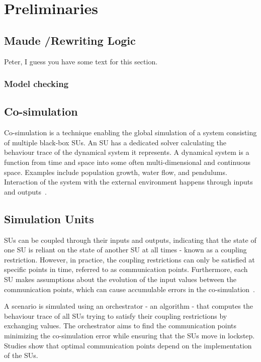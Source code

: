 \section{Preliminaries}\label{sc:background}
\subsection{Maude /Rewriting Logic}
Peter, I guess you have some text for this section. 

\subsubsection{Model checking}


\subsection{Co-simulation}
Co-simulation is a technique enabling the global simulation of a system consisting of multiple black-box SUs. 
An SU has a dedicated solver calculating the behaviour trace of the dynamical system it represents. 
A dynamical system is a function from time and space into some often multi-dimensional and continuous space. Examples include population growth, water flow, and pendulums. 
Interaction of the system with the external environment happens through inputs and outputs~\cite{Gomes2019a,Kubler2000}.

\subsection{Simulation Units}
SUs can be coupled through their inputs and outputs, indicating that the state of one SU is reliant on the state of another SU at all times - known as a coupling restriction. However, in practice, the coupling restrictions can only be satisfied at specific points in time, referred to as communication points. Furthermore, each SU makes assumptions about the evolution of the input values between the communication points, which can cause accumulable errors in the co-simulation~\cite{Arnold2014}. 

A scenario is simulated using an orchestrator - an algorithm - that computes the behaviour trace of all SUs trying to satisfy their coupling restrictions by exchanging values. 
The orchestrator aims to find the communication points minimizing the co-simulation error while ensuring that the SUs move in lockstep. 
Studies \cite{Gomes2019,Oakes2021,Gomes2018f,Schweizer2015c,Gomes2018a} show that optimal communication points depend on the implementation of the SUs.

